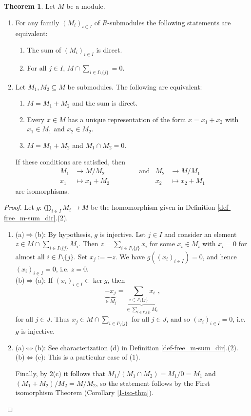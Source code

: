 \documentclass[12pt,a4paper]{report}
\theoremstyle{definition}
\newtheorem{theorem}{Theorem}[chapter] %
\theoremstyle{num.custom-title}
\DeclareMathOperator{\imp}{\Rightarrow}
\DeclareMathOperator{\sm}{\setminus}
\DeclareMathOperator{\sse}{\subseteq}
\renewcommand{\iff}{\Leftrightarrow}
\begin{document}
\begin{theorem}
Let $M$ be a module.
\begin{enumerate}
\item For any family $(M_i)_{i \in I}$ of $R$-submodules the following statements are equivalent:
\begin{enumerate}
\item The sum of $(M_i)_{i \in I}$ is direct.
\item For all $j \in I$, $M \cap \sum_{i \in I \sm \{j\}} = 0$.
\end{enumerate}
\item Let $M_1,M_2 \sse M$ be submodules. The following are equivalent:
\begin{enumerate}
\item $M = M_1+M_2$ and the sum is direct.
\item Every $x \in M$ has a unique representation of the form $x = x_1+x_2$ with $x_1 \in M_1$ and $x_2 \in M_2$.
\item $M=M_1+M_2$ and $M_1 \cap M_2 = 0$.
\end{enumerate}
If these conditions are satisfied, then
\begin{align*}
M_1 &\to M/M_2  \quad \quad \quad \quad \quad \text{and}  &M_2 &\to M/M_1 \\
x_1 &\mapsto x_1+M_2    &x_2 &\mapsto x_2+M_1
\end{align*}
are isomorphisms.
\end{enumerate}
\begin{proof}
Let $g : \bigoplus_{i \in I} M_i \to M$ be the homomorphism given in Definition \ref{def-free_m-sum_dir}.(2).
\begin{enumerate}
\item (a)$\imp$(b): By hypothesis, $g$ is injective. Let $j \in I$ and consider an element $z \in M \cap \sum_{i \in I \sm \{j\}} M_i$. Then $z = \sum_{i \in I \sm \{j\}} x_i$ for some $x_i \in M_i$ with $x_i = 0$ for almost all $i \in I \sm \{j\}$. Set $x_j := -z$. We have $g((x_i)_{i \in I})=0$, and hence $(x_i)_{i \in I} = 0$, i.e. $z=0$.\\
(b)$\imp$(a): If $(x_i)_{i \in I} \in \ker g$, then 
\[
\underbrace{-x_j}_{\in M_j} = \underbrace{\sum_{i \in I \sm \{j\}} x_i}_{\in \sum_{i \in I \sm \{j\}} M_i},
\]
for all $j \in J$. Thus $x_j \in M \cap \sum_{i \in I \sm \{j\}}$ for all $j \in J$, and so $(x_i)_{i \in I} =0$, i.e. $g$ is injective.
\item (a)$\iff$(b): See characterization (d) in Definition \ref{def-free_m-sum_dir}.(2).\\
(b)$\iff$(c): This is a particular case of (1).

Finally, by 2(c) it follows that $M_1/(M_1 \cap M_2) = M_1/0 = M_1$ and $(M_1+M_2)/M_2 = M/M_2$, so the statement follows by the First isomorphism Theorem (Corollary \ref{1-iso-thm}).
\end{enumerate}
\end{proof}
\end{theorem}
\end{document}

